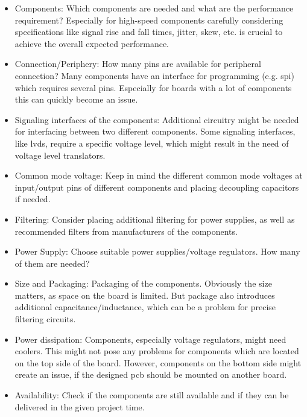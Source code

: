 \begin{itemize}
	\item Components: Which components are needed and what are the performance requirement? Especially for high-speed components carefully considering specifications like signal rise and fall times, jitter, skew, etc. is crucial to achieve the overall expected performance.
	\item Connection/Periphery: How many pins are available for peripheral connection? Many components have an interface for programming (e.g. \gls{spi}) which requires several pins. Especially for boards with a lot of components this can quickly become an issue.
	\item Signaling interfaces of the components: Additional circuitry might be needed for interfacing between two different components. Some signaling interfaces, like \gls{lvds}, require a specific voltage level, which might result in the need of voltage level translators.
	\item Common mode voltage: Keep in mind the different common mode voltages at input/output pins of different components and placing decoupling capacitors if needed.
	\item Filtering: Consider placing additional filtering for power supplies, as well as recommended filters from manufacturers of the components. 
	\item Power Supply: Choose suitable power supplies/voltage regulators. How many of them are needed?
	\item Size and Packaging: Packaging of the components. Obviously the size matters, as space on the board is limited. But package also introduces additional capacitance/inductance, which can be a problem for precise filtering circuits. 
	\item Power dissipation: Components, especially voltage regulators, might need coolers. This might not pose any problems for components which are located on the top side of the board. However, components on the bottom side might create an issue, if the designed \gls{pcb} should be mounted on another board.
	\item Availability: Check if the components are still available and if they can be delivered in the given project time.
\end{itemize}  
 
